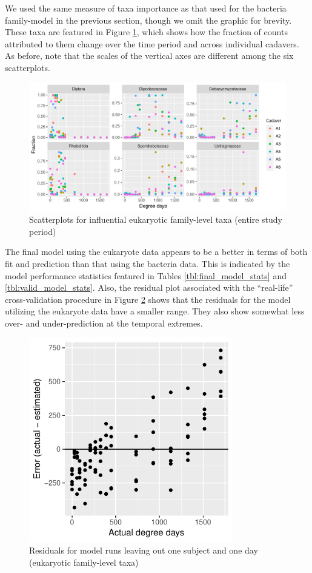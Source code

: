 \documentclass{article}
\begin{document}
We used the same measure of taxa importance as that used for the
bacteria family-model in the previous section, though we omit the
graphic for brevity.  These taxa are featured in Figure
\ref{fig:infl_euk_family_all_data_scatter}, which shows how the
fraction of counts attributed to them change over the time period and
across individual cadavers.  As before, note that the scales of the
vertical axes are different among the six scatterplots.
\begin{figure}
  \centering
  \includegraphics[width=6.5in]{../eukaryote_data/only_families/all_time_steps/hit_1perc_twice/infl_euk_family_all_data_scatter}
  \caption{Scatterplots for influential eukaryotic family-level taxa (entire study period)}
  \label{fig:infl_euk_family_all_data_scatter}
\end{figure}

The final model using the eukaryote data appears to be a better in
terms of both fit and prediction than that using the bacteria data.
This is indicated by the model performance statistics featured in
Tables \ref{tbl:final_model_stats} and \ref{tbl:valid_model_stats}.
Also, the residual plot associated with the ``real-life''
cross-validation procedure in Figure
\ref{fig:leave_one_out_resids_euk_family_taxa} shows that the
residuals for the model utilizing the eukaryote data have a smaller
range.  They also show somewhat less over- and under-prediction at the
temporal extremes.
\begin{figure}
  \centering
  \includegraphics[width=3.5in]{../eukaryote_data/only_families/all_time_steps/hit_1perc_twice/leave_out_one_subj_and_one_day_residuals}
  \caption{Residuals for model runs leaving out one subject and one day (eukaryotic family-level taxa)}
  \label{fig:leave_one_out_resids_euk_family_taxa}
\end{figure}
\end{document}

